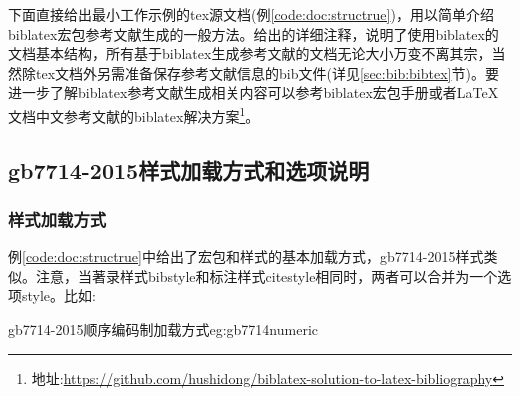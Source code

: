 
下面直接给出最小工作示例的tex源文档(例\ref{code:doc:structrue})，用以简单介绍biblatex宏包参考文献生成的一般方法。给出的详细注释，说明了使用biblatex的文档基本结构，所有基于biblatex生成参考文献的文档无论大小万变不离其宗，当然除tex文档外另需准备保存参考文献信息的bib文件(详见\ref{sec:bib:bibtex}节)。要进一步了解biblatex参考文献生成相关内容可以参考biblatex宏包手册或者LaTeX 文档中文参考文献的biblatex解决方案\footnote{地址:\url{https://github.com/hushidong/biblatex-solution-to-latex-bibliography}}。



\subsection{gb7714-2015样式加载方式和选项说明}
\subsubsection{样式加载方式}
例\ref{code:doc:structrue}中给出了宏包和样式的基本加载方式，gb7714-2015样式类似。注意，当著录样式bibstyle和标注样式citestyle相同时，两者可以合并为一个选项style。比如:

\begin{codetex}{gb7714-2015顺序编码制加载方式}{eg:gb7714numeric}
\usepackage[backend=biber,bibstyle=gb7714-2015,citestyle=gb7714-2015]{biblatex}
\usepackage[backend=biber,style=gb7714-2015,align=left,gbpub=true]{biblatex}
\end{codetex}

